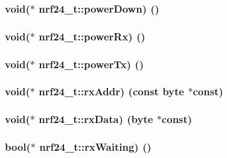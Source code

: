 \subsubsection[{power\+Down}]{\setlength{\rightskip}{0pt plus 5cm}void($\ast$ nrf24\+\_\+t\+::power\+Down) ()}\label{structnrf24__t_aead930e67d5d5eb04822cb4ae990685d}
\hypertarget{structnrf24__t_ab25e37a1480a77544d05e50d395388cb}{}
\subsubsection[{power\+Rx}]{\setlength{\rightskip}{0pt plus 5cm}void($\ast$ nrf24\+\_\+t\+::power\+Rx) ()}\label{structnrf24__t_ab25e37a1480a77544d05e50d395388cb}
\hypertarget{structnrf24__t_a92ed761e9c215786b80685a915ce87d7}{}
\subsubsection[{power\+Tx}]{\setlength{\rightskip}{0pt plus 5cm}void($\ast$ nrf24\+\_\+t\+::power\+Tx) ()}\label{structnrf24__t_a92ed761e9c215786b80685a915ce87d7}
\hypertarget{structnrf24__t_acf773cd1e2f2c5c0ce507320f9b7a45f}{}
\subsubsection[{rx\+Addr}]{\setlength{\rightskip}{0pt plus 5cm}void($\ast$ nrf24\+\_\+t\+::rx\+Addr) (const {\bf byte} $\ast$const)}\label{structnrf24__t_acf773cd1e2f2c5c0ce507320f9b7a45f}
\hypertarget{structnrf24__t_a8d5ef96e697b56dcf24469366ebf2e58}{}
\subsubsection[{rx\+Data}]{\setlength{\rightskip}{0pt plus 5cm}void($\ast$ nrf24\+\_\+t\+::rx\+Data) ({\bf byte} $\ast$const)}\label{structnrf24__t_a8d5ef96e697b56dcf24469366ebf2e58}
\hypertarget{structnrf24__t_a55d42334a0c98fdf58b7125c843d1370}{}
\subsubsection[{rx\+Waiting}]{\setlength{\rightskip}{0pt plus 5cm}bool($\ast$ nrf24\+\_\+t\+::rx\+Waiting) ()}\label{structnrf24__t_a55d42334a0c98fdf58b7125c843d1370}
\hypertarget{structnrf24__t_abfc805d8cb41f8a3bf611a76a5d830db}{}
